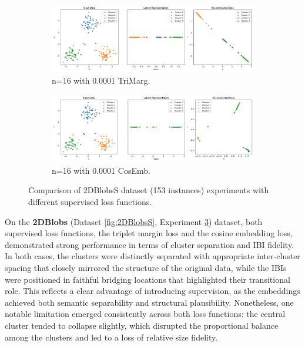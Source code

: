 \begin{figure}[htbp]
  \centering
  \begin{subfigure}[b]{1.0\textwidth}
    \centering
    \includegraphics[width=\linewidth]{images/RQ3/tri/2DBlobsS_16_0.0001.png}
    \caption{n=16 with 0.0001 TriMarg.}
    \label{fig:RQ3/tri/2DBlobsS}
  \end{subfigure}
  \hfill
  \begin{subfigure}[b]{1.0\textwidth}
    \centering
    \includegraphics[width=\linewidth]{images/RQ3/cos/2DBlobsS_16_0.0001.png}
    \caption{n=16 with 0.0001 CosEmb.}
    \label{fig:RQ3/cos/2DBlobsS}
  \end{subfigure} 

  \caption{Comparison of 2DBlobsS dataset (153 instances) experiments with different
supervised loss functions.}
  \label{fig:RQ3/2DBlobsS}
\end{figure}

On the \textbf{2DBlobs} (Dataset \ref{fig:2DBlobsS}, Experiment \ref{fig:RQ3/2DBlobsS}) dataset, both supervised loss functions, the triplet margin loss and the cosine embedding loss, demonstrated strong performance in terms of cluster separation and IBI fidelity. In both cases, the clusters were distinctly separated with appropriate inter-cluster spacing that closely mirrored the structure of the original data, while the IBIs were positioned in faithful bridging locations that highlighted their transitional role. This reflects a clear advantage of introducing supervision, as the embeddings achieved both semantic separability and structural plausibility. Nonetheless, one notable limitation emerged consistently across both loss functions: the central cluster tended to collapse slightly, which disrupted the proportional balance among the clusters and led to a loss of relative size fidelity.

